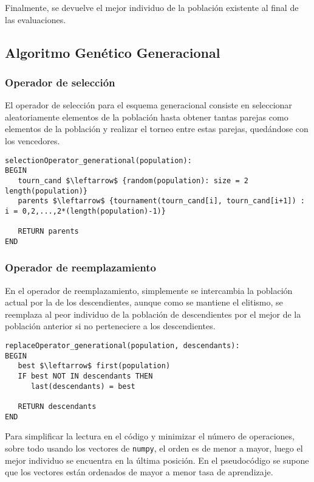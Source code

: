 \documentclass[11pt,leqno]{article}
\begin{document}
	Finalmente, se devuelve el mejor individuo de la población existente al final de las evaluaciones. 

\subsection{Algoritmo Genético Generacional}

\subsubsection{Operador de selección}

	El operador de selección para el esquema generacional consiste en seleccionar aleatoriamente elementos de la población hasta obtener tantas parejas como elementos de la población y realizar el torneo entre estas parejas, quedándose con los vencedores.
	
\begin{lstlisting}[mathescape=true]
selectionOperator_generational(population):
BEGIN
   tourn_cand $\leftarrow$ {random(population): size = 2 length(population)}
   parents $\leftarrow$ {tournament(tourn_cand[i], tourn_cand[i+1]) : i = 0,2,...,2*(length(population)-1)}
   
   RETURN parents
END
\end{lstlisting}

\subsubsection{Operador de reemplazamiento}

	En el operador de reemplazamiento, simplemente se intercambia la población actual por la de los descendientes, aunque como se mantiene el elitismo, se reemplaza al peor individuo de la población de descendientes por el mejor de la población anterior si no perteneciere a los descendientes.
	
\begin{lstlisting}[mathescape=true]
replaceOperator_generational(population, descendants):
BEGIN
   best $\leftarrow$ first(population)
   IF best NOT IN descendants THEN
      last(descendants) = best
   
   RETURN descendants
END
\end{lstlisting}

Para simplificar la lectura en el código y minimizar el número de operaciones, sobre todo usando los vectores de \texttt{numpy}, el orden es de menor a mayor, luego el mejor individuo se encuentra en la última posición. En el pseudocódigo se supone que los vectores están ordenados de mayor a menor tasa de aprendizaje.
\end{document}
